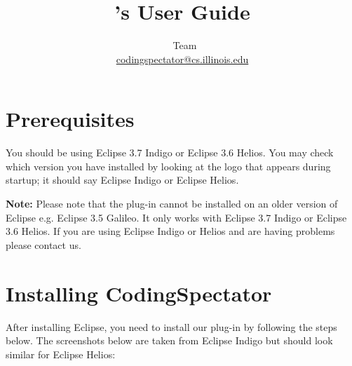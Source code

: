 \documentclass{article}
\title{\codspec's User Guide}
\author{\codspec\
Team\\\href{mailto:codingspectator@cs.illinois.edu}{codingspectator@cs.illinois.edu}}
\newcommand\codspec{CodingSpectator}
\newcommand\warnnote[1]{\textbf{Note: }#1}
\begin{document}
%
\maketitle
%
\tableofcontents
%
\section{Prerequisites}

You should be using Eclipse 3.7 Indigo or Eclipse 3.6 Helios. You may check
which version you have installed by looking at the logo that appears during
startup; it should say Eclipse Indigo or Eclipse Helios.

\warnnote{Please note that the plug-in cannot be installed on an older version
of Eclipse e.g. Eclipse 3.5 Galileo. It only works with Eclipse 3.7 Indigo or
Eclipse 3.6 Helios. If you are using Eclipse Indigo or Helios and are having
problems please contact us.} 

\section{Installing \codspec}

After installing Eclipse, you need to install our plug-in by following the steps
below. The screenshots below are taken from Eclipse Indigo but should look
similar for Eclipse Helios:
\end{document}
